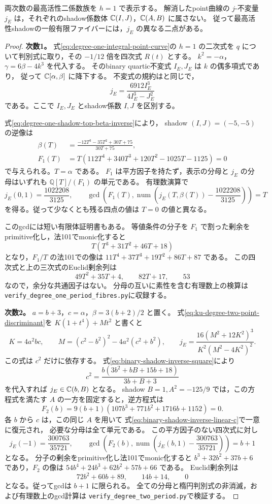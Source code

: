 \begin{proposition}[楕円不変量の非降下]
\label{prop:ku-point-j-nondescending}
両次数の最高活性二係数族を $h=1$ で表示する。
解消したpoint曲線の $j$-不変量 $j_E$ は，それぞれのshadow係数体
$\mathbb C(I,J)$，$\mathbb C(A,B)$ に属さない。
従って最高活性shadowの一般有限ファイバーには，$j_E$ の異なる二点がある。
\end{proposition}
\begin{proof}
\textbf{次数1。}
式\eqref{eq:degree-one-integral-point-curve}の $h=1$ の二次式を
$q$ について判別式に取り，その $-1/12$ 倍を四次式 $R(t)$ とする。
$k^2=-\alpha$，$\gamma=6\beta-4k^3$ を代入する。
そのbinary quartic不変式 $I_E,J_E$ は $k$ の偶多項式であり，
従って $\mathbb C[\alpha,\beta]$ に降下する。
不変式の規約は\cite[Section~2, (1)--(2)]{Fisher2022}と同じで，
\[
 j_E=\frac{6912I_E^3}{4I_E^3-J_E^2}
\]
である。ここで $I_E,J_E$ とshadow係数 $I,J$ を区別する。

式\eqref{eq:degree-one-shadow-top-beta-inverse}により，
shadow $(I,J)=(-5,-5)$ の逆像は
\begin{align*}
 \beta(T)&=\frac{-12T^3-35T^2+30T+75}{30T+75},\\
 F_1(T)&=T(112T^4+340T^3+120T^2-1025T-1125)=0
\end{align*}
で与えられる。$T=\alpha$ である。
$F_1$ は平方因子を持たず，表示の分母と $j_E$ の分母はいずれも
$\mathbb Q[T]/(F_1)$ の単元である。
有理数演算で
\[
 j_E(0,1)=\frac{1022208}{3125},\qquad
 \gcd\left(F_1(T),\operatorname{num}\left(
 j_E(T,\beta(T))-\frac{1022208}{3125}\right)\right)=T
\]
を得る。従って少なくとも残る四点の値は $T=0$ の値と異なる。

このgcdには短い有限体証明書もある。
等値条件の分子を $F_1$ で割った剰余をprimitive化し，法101でmonic化すると
\[
 T(T^3+31T^2+46T+18)
\]
となり，$F_1/T$ の法101での像は
$11T^4+37T^3+19T^2+86T+87$ である。
この四次式と上の三次式のEuclid剰余列は
\[
 49T^2+35T+4,\qquad82T+17,\qquad53
\]
なので，余分な共通因子はない。
分母の互いに素性を含む有理数上の検算は
\nolinkurl{verify_degree_one_period_fibres.py}に収録する。

\textbf{次数2。}
$a=b+3$，$c=\alpha$，$\beta=3(b+2)/2$ と置く。
式\eqref{eq:ku-degree-two-point-discriminant}を
$K(1+t^4)+Mt^2$ と書くと
\[
 K=4a^2bc,\qquad
 M=(c^2-b^2)^2-4a^2(c^2+b^2),\qquad
 j_E=\frac{16(M^2+12K^2)^3}{K^2(M^2-4K^2)^2}.
\]
この式は $c^2$ だけに依存する。
式\eqref{eq:binary-shadow-inverse-square}により
\[
 c^2=\frac{b(3b^2+bB+15b+18)}{3b+B+3}
\]
を代入すれば $j_E\in\mathbb C(b,B)$ となる。
shadow $B=1,A^2=-125/9$ では，この方程式を満たす $A$ の一方を固定すると，逆方程式は
\[
 F_2(b)=9(b+1)(107b^3+771b^2+1716b+1152)=0.
\]
各 $b$ から $c$ は，この同じ $A$ を用いて
式\eqref{eq:binary-shadow-inverse-linear-c}で一意に復元され，
必要な分母は全て単元である。
この平方因子のない四次式に対し
\[
 j_E(-1)=\frac{300763}{35721},\qquad
 \gcd\left(F_2(b),\operatorname{num}\left(
 j_E(b,1)-\frac{300763}{35721}\right)\right)=b+1
\]
となる。
分子の剰余をprimitive化し法101でmonic化すると
$b^3+32b^2+37b+6$ であり，$F_2$ の像は
$54b^4+24b^3+62b^2+57b+66$ である。
Euclid剰余列は
\[
 72b^2+60b+89,\qquad14b+14,\qquad0
\]
となる。従ってgcdは $b+1$ に限られる。
全ての分母と楕円判別式の非消滅，および有理数上のgcd計算は
\texttt{verify\_degree\_two\_period.py}で検証する。


\end{proof}
